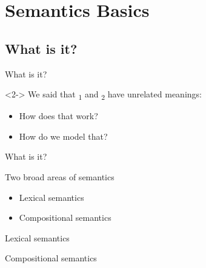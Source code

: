 \documentclass{beamer}
\subtitle[Intro to Semantics]{Introduction to Semantics}
\newcommand{\suboneone}{What is it?}
\begin{document}
  

  \section{Semantics Basics}
    \subsection{\suboneone}
      \begin{frame}{\suboneone}
        \begin{definition}
          
        \end{definition}
        \begin{example}<2->
          We said that \textsubscript{1} and \textsubscript{2} have unrelated meanings:
          \begin{itemize}
            \item How does that work?
            \item How do we model that?
          \end{itemize}
        \end{example}
      \end{frame}

      \begin{frame}{\suboneone}
        \begin{block}{Two broad areas of semantics}
          \begin{itemize}
            \item Lexical semantics
            \item Compositional semantics
          \end{itemize}
        \end{block}
        \begin{alertblock}{Lexical semantics}
          
        \end{alertblock}
        \begin{alertblock}{Compositional semantics}
          
        \end{alertblock}
      \end{frame}
\end{document}
